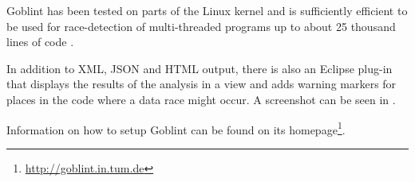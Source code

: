 Goblint has been tested on parts of the Linux kernel and is sufficiently efficient to be used for race-detection of multi-threaded programs up to about 25 thousand lines of code \cite{Vojdani10Thesis,goblint.pdf}.

In addition to XML, JSON and HTML output, there is also an Eclipse plug-in that displays the results of the analysis in a view and adds warning markers for places in the code where a data race might occur. A screenshot can be seen in .

Information on how to setup Goblint can be found on its homepage\footnote{\url{http://goblint.in.tum.de}}.



